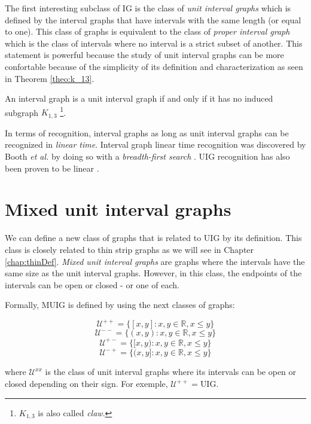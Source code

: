 The first interesting subclass of IG is the class of \emph{unit interval graphs} which is defined by the interval graphs that have intervals with the same length (or equal to one). This class of graphs is equivalent to the class of \emph{proper interval graph} which is the class of intervals where no interval is a strict subset of another. This statement is powerful because the study of unit interval graphs can be more confortable because of the simplicity of its definition and characterization as seen in Theorem \ref{theo:k_13}.

\begin{theorem}
  \label{theo:k_13}
  An interval graph is a unit interval graph if and only if it has no induced subgraph $K_{1,3}$ \footnote{$K_{1,3}$ is also called \emph{claw}.}.
\end{theorem}

In terms of recognition, interval graphs as long as unit interval graphs can be recognized in \emph{linear time}. Interval graph linear time recognition was discovered by Booth \textit{et al.} by doing so with a \emph{breadth-first search} \cite{boothTestingConsecutiveOnes1976}. UIG recognition has also been proven to be linear \cite{corneil1987extensions}.

\section{Mixed unit interval graphs}
\label{sec:muig}

We can define a new class of graphs that is related to UIG by its definition. This class is closely related to thin strip graphs as we will see in Chapter \ref{chap:thinDef}. \emph{Mixed unit interval graphs} are graphs where the intervals have the same size as the unit interval graphs. However, in this class, the endpoints of the intervals can be open or closed - or one of each.

Formally, MUIG is defined by using the next classes of graphs:

$$\mathcal{U}^{++} = \{[x,y] : x,y \in \mathbb{R}, x\leq y\}$$
$$\mathcal{U}^{--} = \{(x,y) : x,y \in \mathbb{R}, x\leq y\}$$
$$\mathcal{U}^{+-} = \{[x,y) : x,y \in \mathbb{R}, x\leq y\}$$
$$\mathcal{U}^{-+} = \{(x,y] : x,y \in \mathbb{R}, x\leq y\}$$

where $\mathcal{U}^{xx}$ is the class of unit interval graphs where its intervals can be open or closed depending on their sign. For exemple, $\mathcal{U}^{++} = \text{UIG}$.

